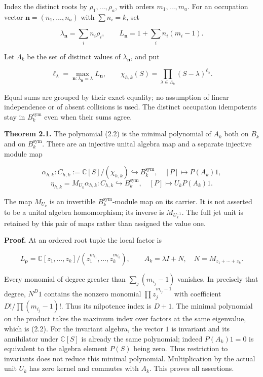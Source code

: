\documentclass[
]{article}
\begin{document}
Index the distinct roots by \(\rho_1,\ldots,\rho_a\), with orders
\(m_1,\ldots,m_a\). For an occupation vector
\(\mathbf n=(n_1,\ldots,n_a)\) with \(\sum n_i=k\), set

\[\lambda_{\mathbf n}=\sum_i n_i\rho_i,\qquad
L_{\mathbf n}=1+\sum_i n_i(m_i-1).\tag{2.1}\]

Let \(\Lambda_k\) be the set of distinct values of
\(\lambda_{\mathbf n}\), and put

\[\ell_\lambda=\max_{\mathbf n:\lambda_{\mathbf n}=\lambda}L_{\mathbf n},\qquad
\boxed{\chi_{h,k}(S)=\prod_{\lambda\in\Lambda_k}(S-\lambda)^{\ell_\lambda}.}\tag{2.2}\]

Equal sums are grouped by their exact equality; no assumption of linear
independence or of absent collisions is used. The distinct occupation
idempotents stay in \(B_k^{\mathrm{sym}}\) even when their sums agree.

\textbf{Theorem 2.1.} The polynomial (2.2) is the minimal polynomial of
\(A_k\) both on \(B_k\) and on \(B_k^{\mathrm{sym}}\). There are an
injective unital algebra map and a separate injective module map

\[\alpha_{h,k}:C_{h,k}:=\mathbb C[S]/(\chi_{h,k})\hookrightarrow B_k^{\mathrm{sym}},\quad [P]\mapsto P(A_k)1,\]
\[\boxed{\eta_{h,k}=M_{U_k}\alpha_{h,k}:C_{h,k}\hookrightarrow B_k^{\mathrm{sym}},\quad
[P]\mapsto U_kP(A_k)1.}\tag{2.3}\]

The map \(M_{U_k}\) is an invertible \(B_k^{\mathrm{sym}}\)-module map
on its carrier. It is not asserted to be a unital algebra homomorphism;
its inverse is \(M_{U_k^{-1}}\). The full jet unit is retained by this
pair of maps rather than assigned the value one.

\textbf{Proof.} At an ordered root tuple the local factor is

\[L_{\boldsymbol\rho}=\mathbb C[z_1,\ldots,z_k]/(z_1^{m_{i_1}},\ldots,z_k^{m_{i_k}}),\qquad
A_k=\lambda I+N,\quad N=M_{z_1+\cdots+z_k}.\]

Every monomial of degree greater than \(\sum_j(m_{i_j}-1)\) vanishes. In
precisely that degree, \(N^D1\) contains the nonzero monomial
\(\prod z_j^{m_{i_j}-1}\) with coefficient \(D!/\prod(m_{i_j}-1)!\).
Thus its nilpotence index is \(D+1\). The minimal polynomial on the
product takes the maximum index over factors at the same eigenvalue,
which is (2.2). For the invariant algebra, the vector \(1\) is invariant
and its annihilator under \(\mathbb C[S]\) is already the same
polynomial; indeed \(P(A_k)1=0\) is equivalent to the algebra element
\(P(S)\) being zero. Thus restriction to invariants does not reduce this
minimal polynomial. Multiplication by the actual unit \(U_k\) has zero
kernel and commutes with \(A_k\). This proves all assertions.
\end{document}
